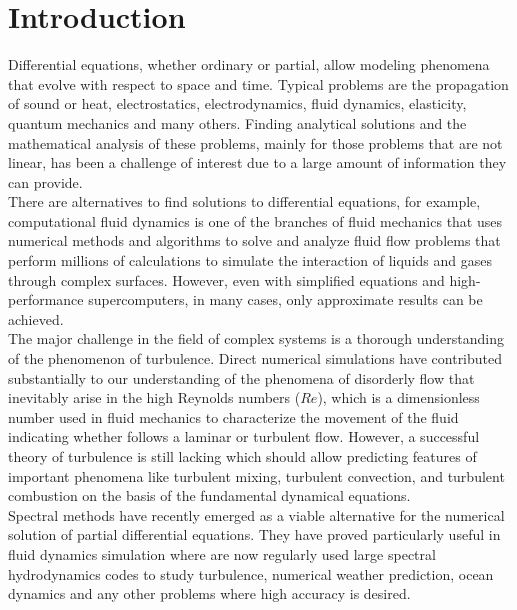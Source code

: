 \chapter{Introduction}
\label{Introduction}

	Differential equations, whether ordinary or partial, allow modeling phenomena that evolve with respect to space and time. Typical problems are the propagation of sound or heat, electrostatics, electrodynamics, fluid dynamics, elasticity, quantum mechanics and many others. Finding analytical solutions and the mathematical analysis of these problems, mainly for those problems that are not linear, has been a challenge of interest due to a large amount of information they can provide. \\  
	
	There are alternatives to find solutions to differential equations, for example, computational fluid dynamics is one of the branches of fluid mechanics that uses numerical methods and algorithms to solve and analyze fluid flow problems that perform millions of calculations to simulate the interaction of liquids and gases through complex surfaces. However, even with simplified equations and high-performance supercomputers, in many cases, only approximate results can be achieved. \\
	
	The major challenge in the field of complex systems is a thorough understanding of the phenomenon of turbulence. Direct numerical simulations have contributed substantially to our understanding of the phenomena of disorderly flow that inevitably arise in the high Reynolds numbers ($Re$), which is a dimensionless number used in fluid mechanics to characterize the movement of the fluid indicating whether follows a laminar or turbulent flow. However, a successful theory of turbulence is still lacking which should allow predicting features of important phenomena like turbulent mixing, turbulent convection, and turbulent combustion on the basis of the fundamental dynamical equations.  \\
	
	Spectral methods have recently emerged as a viable alternative for the numerical solution of partial differential equations. They have proved particularly useful in fluid dynamics simulation where are now regularly used large spectral hydrodynamics codes to study turbulence, numerical weather prediction, ocean dynamics and any other problems where high accuracy is desired. \\
	
